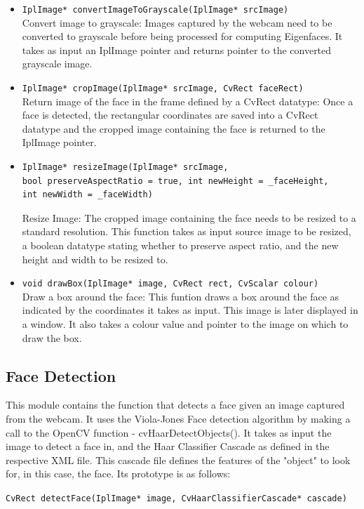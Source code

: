 \documentclass[12pt]{report}			%
\begin{document}
\begin{itemize}
\item 
\verb+IplImage* convertImageToGrayscale(IplImage* srcImage)+\\
Convert image to grayscale: Images captured by the webcam need to be converted to grayscale before being processed for computing Eigenfaces. It takes as input an IplImage pointer and returns pointer to the converted grayscale image.
\item
\verb+IplImage* cropImage(IplImage* srcImage, CvRect faceRect)+\\
Return image of the face in the frame defined by a CvRect datatype: Once a face is detected, the rectangular coordinates are saved into a CvRect datatype and the cropped image containing the face is returned to the IplImage pointer.
\item
\begin{verbatim}
IplImage* resizeImage(IplImage* srcImage,
bool preserveAspectRatio = true, int newHeight = _faceHeight,
int newWidth = _faceWidth)
\end{verbatim}
Resize Image: The cropped image containing the face needs to be resized to a standard resolution. This function takes as input source image to be resized, a boolean datatype stating whether to preserve aspect ratio, and the new height and width to be resized to.
\item
\verb+void drawBox(IplImage* image, CvRect rect, CvScalar colour)+\\
Draw a box around the face: This funtion draws a box around the face as indicated by the coordinates it takes as input. This image is later displayed in a window. It also takes a colour value and pointer to the image on which to draw the box.
\end{itemize}

\subsection { Face Detection }
This module contains the function that detects a face given an image captured from the webcam. It uses the Viola-Jones Face detection algorithm by making a call to the OpenCV function - cvHaarDetectObjects(). It takes as input the image to detect a face in, and the Haar Classifier Cascade as defined in the respective XML file. This cascade file defines the features of the "object" to look for, in this case, the face. Its prototype is as follows:
\begin{center}
\verb+CvRect detectFace(IplImage* image, CvHaarClassifierCascade* cascade)+
\end{center}
\end{document}
